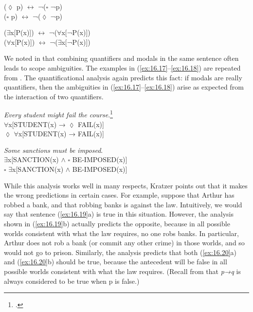 \ea \label{ex:16.15}
\ea    (${\lozenge}$ p)  $\leftrightarrow $  ¬(${\square}$ ¬p)\\
\ex   (${\square}$ p)  $\leftrightarrow $  ¬(${\lozenge}$ ¬p)
                       \z
\z

\ea \label{ex:16.16}
\ea    (${\exists}$x[P(x)])  $\leftrightarrow $  ¬(${\forall}$x[¬P(x)])\\
\ex   (${\forall}$x[P(x)])  $\leftrightarrow $  ¬(${\exists}$x[¬P(x)])
                       \z
\z


We noted in  that combining quantifiers and modals in the same sentence often leads to scope ambiguities. The examples in (\ref{ex:16.17}--\ref{ex:16.18}) are repeated from . The quantificational analysis again predicts this fact: if modals are really quantifiers, then the ambiguities in (\ref{ex:16.17}--\ref{ex:16.18}) arise as expected from the interaction of two quantifiers.


\ea \label{ex:16.17}
\textit{Every student might fail the course}.\footnote{\citet[48]{Abbott2010}.}\\
\ea  ${\forall}$x[STUDENT(x) → ${\lozenge}$ FAIL(x)]\\
\ex ${\lozenge}$ ${\forall}$x[STUDENT(x) → FAIL(x)]
                       \z
\z

\ea \label{ex:16.18}
\textit{Some sanctions must be imposed}.\\
\ea  ${\exists}$x[SANCTION(x) $\wedge$ ${\square}$ BE-IMPOSED(x)]\\
\ex ${\square}$ ${\exists}$x[SANCTION(x) $\wedge$ BE-IMPOSED(x)]
                       \z
\z


While this analysis works well in many respects, Kratzer points out that it makes the wrong predictions in certain cases. For example, suppose that Arthur has robbed a bank, and that robbing banks is against the law. Intuitively, we would say that sentence (\ref{ex:16.19}a) is true in this situation. However, the analysis shown in (\ref{ex:16.19}b) actually predicts the opposite, because in all possible worlds consistent with what the law requires, no one robs banks. In particular, Arthur does not rob a bank (or commit any other crime) in those worlds, and so would not go to prison. Similarly, the analysis predicts that both (\ref{ex:16.20}a) and (\ref{ex:16.20}b) should be true, because the antecedent will be false in all possible worlds consistent with what the law requires. (Recall from  that \textit{p→q} is always considered to be true when p is false.)


